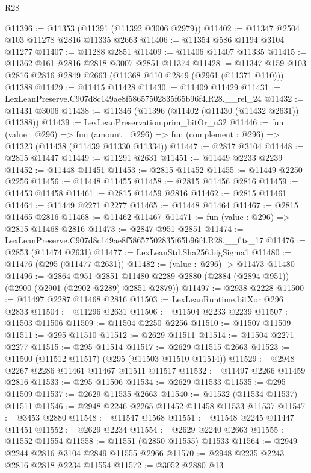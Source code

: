 \begin{lexlean}{R28}
\begin{coremodule}
@11396 := @11353 (@11391 (@11392 @3006 @2979))
@11402 := @11347 @2504 @103 @11278 @2816 @11335 @2663
@11406 := @11354 @586 @1194 @3104 @11277
@11407 := @11288 @2851
@11409 := @11406 @11407 @11335
@11415 := @11362 @161 @2816 @2818 @3007 @2851 @11374
@11428 := @11347 @159 @103 @2816 @2816 @2849 @2663 (@11368 @110 @2849 (@2961 (@11371 @110))) @11388
@11429 := @11415 @11428
@11430 := @11409 @11429
@11431 := LexLeanPreserve.C907d8c149ae8f58657502835f65b96f4.R28.__rel_24
@11432 := @11431 @3006
@11438 := @11346 (@11396 (@11402 (@11430 (@11432 @2631)) @11388))
@11439 := LexLeanPreservation.prim_bitOr_u32
@11446 := fun (value : @296) =>
  fun (amount : @296) => fun (complement : @296) => @11323 (@11438 (@11439 @11330 @11334))
@11447 := @2817 @3104
@11448 := @2815 @11447
@11449 := @11291 @2631
@11451 := @11449 @2233 @2239
@11452 := @11448 @11451
@11453 := @2815 @11452
@11455 := @11449 @2250 @2256
@11456 := @11448 @11455
@11458 := @2815 @11456 @2816
@11459 := @11453 @11458
@11461 := @2815 @11459 @2816
@11462 := @2815 @11461
@11464 := @11449 @2271 @2277
@11465 := @11448 @11464
@11467 := @2815 @11465 @2816
@11468 := @11462 @11467
@11471 := fun (value : @296) => @2815 @11468 @2816
@11473 := @2847 @951 @2851
@11474 := LexLeanPreserve.C907d8c149ae8f58657502835f65b96f4.R28.__fits_17
@11476 := @2853 (@11474 @2631)
@11477 := LexLeanStd.Sha256.bigSigma1
@11480 := @11476 (@295 (@11477 @2631))
@11482 := (value : @296) -> @11473 @11480
@11496 := @2864
    @951
    @2851
    @11480
    @2289
    @2880
    (@2884 (@2894 @951))
    (@2900 (@2901 (@2902 @2289) @2851 @2879))
@11497 := @2938 @2228
@11500 := @11497 @2287 @11468 @2816
@11503 := LexLeanRuntime.bitXor @296 @2833
@11504 := @11296 @2631
@11506 := @11504 @2233 @2239
@11507 := @11503 @11506
@11509 := @11504 @2250 @2256
@11510 := @11507 @11509
@11511 := @295 @11510
@11512 := @2629 @11511
@11514 := @11504 @2271 @2277
@11515 := @295 @11514
@11517 := @2629 @11515 @2663
@11523 := @11500 (@11512 @11517) (@295 (@11503 @11510 @11514))
@11529 := @2948 @2267 @2286 @11461 @11467 @11511 @11517
@11532 := @11497 @2266 @11459 @2816
@11533 := @295 @11506
@11534 := @2629 @11533
@11535 := @295 @11509
@11537 := @2629 @11535 @2663
@11540 := @11532 (@11534 @11537) @11511
@11546 := @2948 @2246 @2265 @11452 @11458 @11533 @11537
@11547 := @3453 @2880
@11548 := @11547 @1568
@11551 := @11548 @2245 @11447 @11451
@11552 := @2629 @2234
@11554 := @2629 @2240 @2663
@11555 := @11552 @11554
@11558 := @11551 (@2850 @11555) @11533
@11564 := @2949 @2244 @2816 @3104 @2849 @11555 @2966
@11570 := @2948 @2235 @2243 @2816 @2818 @2234 @11554
@11572 := @3052 @2880 @13

\end{coremodule}
\end{lexlean}
